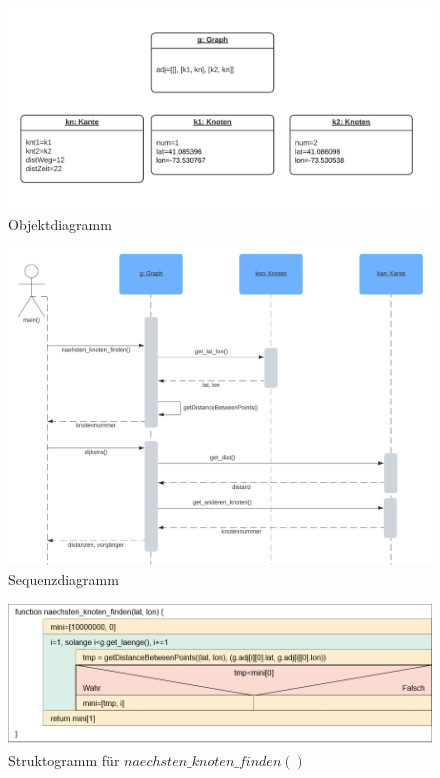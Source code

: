 \documentclass[a4paper,12pt,ngerman]{scrartcl}
\begin{document}
\begin{figure}[!ht]
  \center
  \includegraphics[width=\textwidth]{Objektdiagramm.png}
  \vspace{-1cm}
  \caption{Objektdiagramm}
\end{figure}

\begin{figure}[!ht]
  \center
  \includegraphics[width=\textwidth]{Sequenzdiagramm.png}
  \vspace{-.5cm}
  \caption{Sequenzdiagramm}
\end{figure}

\begin{figure}[!ht]
  \center
  \includegraphics[width=\textwidth]{Struktogramm.png}
  \vspace{-1cm}
  \caption{Struktogramm für $naechsten\_knoten\_finden()$}
\end{figure}
\end{document}
